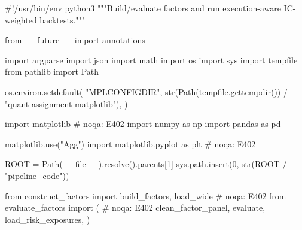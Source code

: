 \documentclass[UTF8,a4paper,fontset=fandol]{ctexart}
\begin{document}
\begin{ProjectCode}
#!/usr/bin/env python3
"""Build/evaluate factors and run execution-aware IC-weighted backtests."""

from __future__ import annotations

import argparse
import json
import math
import os
import sys
import tempfile
from pathlib import Path

os.environ.setdefault(
    "MPLCONFIGDIR",
    str(Path(tempfile.gettempdir()) / "quant-assignment-matplotlib"),
)

import matplotlib  # noqa: E402
import numpy as np
import pandas as pd

matplotlib.use("Agg")
import matplotlib.pyplot as plt  # noqa: E402


ROOT = Path(__file__).resolve().parents[1]
sys.path.insert(0, str(ROOT / "pipeline_code"))

from construct_factors import build_factors, load_wide  # noqa: E402
from evaluate_factors import (  # noqa: E402
    clean_factor_panel,
    evaluate,
    load_risk_exposures,
)



\end{ProjectCode}
\end{document}
